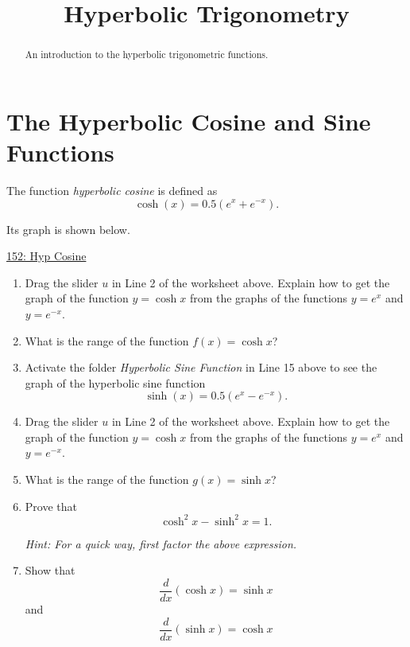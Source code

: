 \documentclass{ximera}
\title{Hyperbolic Trigonometry}
\begin{document}
\begin{abstract}
An introduction to the hyperbolic trigonometric functions.
\end{abstract}
\maketitle


\section{The Hyperbolic Cosine and Sine Functions}

The function \emph{hyperbolic cosine} is defined as
\[
    \cosh(x) = 0.5(e^x + e^{-x}  ).
\]

Its graph is shown below.

\begin{onlineOnly}
    \begin{center}
\end{center}
\end{onlineOnly}

\href{https://www.desmos.com/calculator/nubdwzgsa9}{152: Hyp Cosine}

\begin{enumerate}
\item Drag the slider $u$ in Line 2 of the worksheet above. Explain how to get the graph of the function $y=\cosh x$ from the graphs of the functions $y=e^x$ and $y=e^{-x}$.

\begin{freeResponse}
\end{freeResponse}

\item What is the range of the function $f(x)=\cosh x$?

\item Activate the folder \emph{Hyperbolic Sine Function} in Line 15 above to see the graph of the hyperbolic sine function
\[
   \sinh(x) = 0.5(e^x - e^{-x}  ).
\]
\item Drag the slider $u$ in Line 2 of the worksheet above. Explain how to get the graph of the function $y=\cosh x$ from the graphs of the functions $y=e^x$ and $y=e^{-x}$.
\begin{freeResponse}
\end{freeResponse}

\item What is the range of the function $g(x)=\sinh x$?

\item Prove that 
\[
      \cosh^2x - \sinh^2x = 1.
\]

\emph{Hint: For a quick way, first factor the above expression.}

\item Show that 
\[
   \frac{d}{dx} \left( \cosh x  \right) = \sinh x
\]
and
\[
   \frac{d}{dx} \left( \sinh x  \right) = \cosh x
\]

\end{enumerate}
\end{document}
